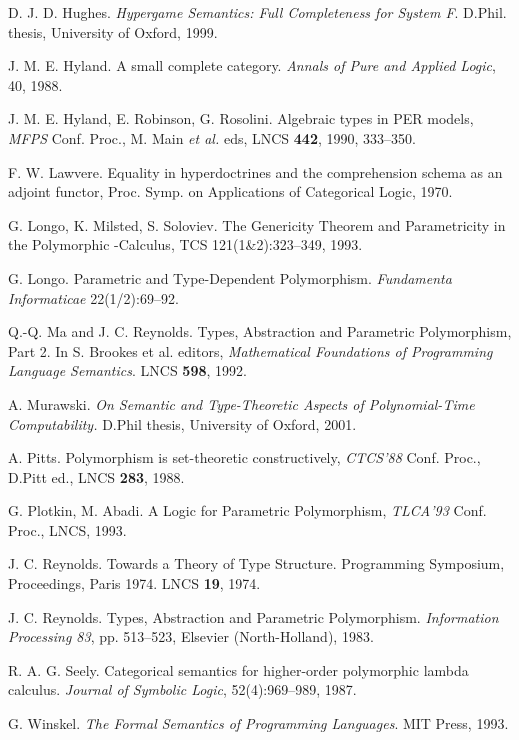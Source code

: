 \documentclass[a4paper,11pt]{article}
\begin{document}
\begin{thebibliography}{DDDD88}
 D. J. D. Hughes.  {\em Hypergame Semantics:
    Full Completeness for System F}. D.Phil. thesis, University of
  Oxford, 1999.

 J. M. E. Hyland. A small complete
  category. {\em Annals of Pure and Applied Logic}, 40, 1988.

 J. M. E. Hyland, E. Robinson,
  G. Rosolini. Algebraic types in PER models, {\em MFPS} Conf. Proc.,
  M. Main {\em et al.} eds, LNCS {\bf 442},
1990, 333--350.

 F. W. Lawvere. Equality in hyperdoctrines and the comprehension schema as an adjoint functor,  Proc.  Symp. on Applications of Categorical Logic, 1970.

 G. Longo, K. Milsted, S. Soloviev.
The Genericity Theorem and Parametricity
in the Polymorphic -Calculus, TCS 121(1\&2):323--349,  1993.

G. Longo. Parametric and Type-Dependent Polymorphism.
{\em Fundamenta Informaticae} 22(1/2):69--92.

Q.-Q. Ma and J. C. Reynolds.
Types, Abstraction and Parametric Polymorphism, Part 2.
In S. Brookes et al. editors, {\em Mathematical Foundations of
Programming Language Semantics}. LNCS {\bf 598}, 1992.

A. Murawski.
{\em On Semantic and Type-Theoretic Aspects of Polynomial-Time Computability.}
D.Phil thesis, University of Oxford, 2001.

 A. Pitts. Polymorphism is set-theoretic constructively,
 {\em CTCS'88} Conf. Proc., D.Pitt ed., LNCS {\bf 283}, 1988.

 G. Plotkin, M. Abadi. A Logic for Parametric
Polymorphism, {\em TLCA'93} Conf. Proc., LNCS, 1993.

 J. C. Reynolds.
Towards a Theory of Type Structure.
Programming Symposium, Proceedings, Paris 1974. LNCS {\bf 19}, 1974.

J. C. Reynolds.
Types, Abstraction and Parametric Polymorphism.
{\em Information Processing 83}, pp. 513--523, Elsevier
(North-Holland), 1983.

R. A. G. Seely.
Categorical semantics for higher-order polymorphic lambda calculus.
{\em Journal of Symbolic Logic}, 52(4):969--989, 1987.

G. Winskel.
{\em The Formal Semantics of Programming Languages}.
MIT Press, 1993.

\end{thebibliography}
\end{document}
